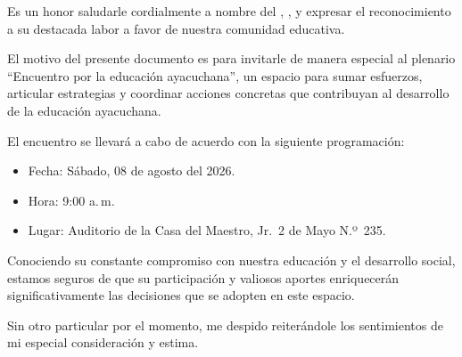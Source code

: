 \documentclass{oficio}
\begin{document}
\lugaryfecha
\numerodocumento



\saludo

Es un honor saludarle cordialmente a nombre del ,
, y expresar el reconocimiento a su
destacada labor a favor de nuestra comunidad educativa.

El motivo del presente documento es para invitarle de manera especial al
plenario ``Encuentro por la educación ayacuchana'', un espacio para sumar
esfuerzos, articular estrategias y coordinar acciones concretas que
contribuyan al desarrollo de la educación ayacuchana.

El encuentro se llevará a cabo de acuerdo con la siguiente programación:

\begin{itemize}
  \item Fecha: Sábado, 08 de agosto del 2026.
  \item Hora: 9:00 a.\,m.
  \item Lugar: Auditorio de la Casa del Maestro, Jr.~2 de Mayo N.º~235.
\end{itemize}

Conociendo su constante compromiso con nuestra educación y el desarrollo
social, estamos seguros de que su participación y valiosos aportes
enriquecerán significativamente las decisiones que se adopten en este
espacio.

Sin otro particular por el momento, me despido reiterándole los
sentimientos de mi especial consideración y estima.

\atentamente
\vfill
\bloquefirma[2.0cm]
\end{document}
